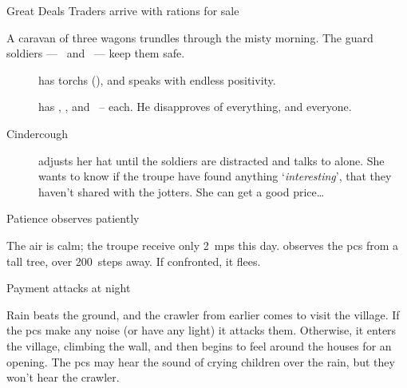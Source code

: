 \documentclass[10pt,twoside]{book}
\begin{document}





\pagestyle{minizine}%

{Great Deals}%
{Traders arrive with \glspl{ration} for sale}%

A caravan of three wagons trundles through the misty morning.
The \gls{guard} \glspl{soldier} --- \composeHumanName\ and \composeHumanName\ --- keep them safe.

\begin{description}
  \item[\composeHumanName]
  has \glspl{torch} (), and speaks with endless positivity.
  \item[\composeHumanName]
  has \rations, \rations, and \rations\ --  each.
  He disapproves of everything, and everyone.
  \item[Cindercough]
  adjusts her hat until the \glspl{soldier} are distracted and talks to  alone.
  She wants to know if the troupe have found anything `\emph{interesting}', that they haven't shared with the \glspl{jotter}.
  She can get a good price\ldots
\end{description}

\begin{figure}[t]
  \chitincrawler
\end{figure}%

{Patience}%
{ observes patiently}%

The air is calm; the troupe receive only 2~\glspl{mp} this day.
 observes the \glspl{pc} from a tall tree, over 200~\glspl{step} away.
If confronted, it flees.

{Payment}%
{ attacks at night}%

Rain beats the ground, and the \gls{crawler} from earlier comes to visit the \gls{village}.
If the \glspl{pc} make any noise (or have any light) it attacks them.
Otherwise, it enters the \gls{village}, climbing the wall, and then begins to feel around the houses for an opening.
The \glspl{pc} may hear the sound of crying children over the rain, but they won't hear the \gls{crawler}.
\end{document}
